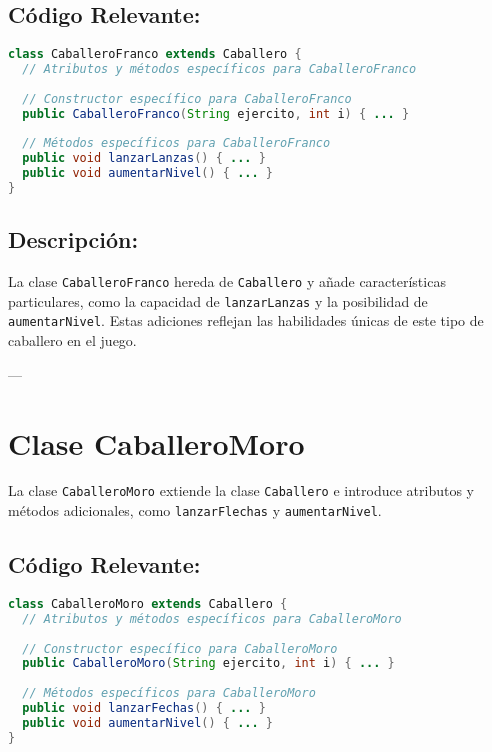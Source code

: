 \subsection*{Código Relevante:}

\begin{lstlisting}[language=Java]
class CaballeroFranco extends Caballero {
  // Atributos y métodos específicos para CaballeroFranco
  
  // Constructor específico para CaballeroFranco
  public CaballeroFranco(String ejercito, int i) { ... }
  
  // Métodos específicos para CaballeroFranco
  public void lanzarLanzas() { ... }
  public void aumentarNivel() { ... }
}
\end{lstlisting}

\subsection*{Descripción:}

La clase \texttt{CaballeroFranco} hereda de \texttt{Caballero} y añade características particulares, como la capacidad de \texttt{lanzarLanzas} y la posibilidad de \texttt{aumentarNivel}. Estas adiciones reflejan las habilidades únicas de este tipo de caballero en el juego.

---

\section{Clase CaballeroMoro}

La clase \texttt{CaballeroMoro} extiende la clase \texttt{Caballero} e introduce atributos y métodos adicionales, como \texttt{lanzarFlechas} y \texttt{aumentarNivel}.

\subsection*{Código Relevante:}

\begin{lstlisting}[language=Java]
class CaballeroMoro extends Caballero {
  // Atributos y métodos específicos para CaballeroMoro
  
  // Constructor específico para CaballeroMoro
  public CaballeroMoro(String ejercito, int i) { ... }
  
  // Métodos específicos para CaballeroMoro
  public void lanzarFechas() { ... }
  public void aumentarNivel() { ... }
}
\end{lstlisting}


